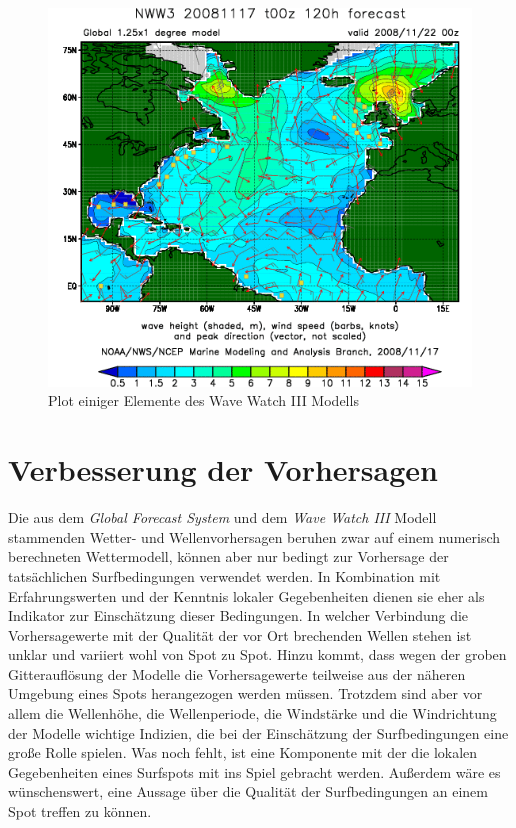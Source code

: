 \begin{figure}[h]
  \begin{center}
    \includegraphics[width=\textwidth]{bilder/wave-watch}
    \caption{Plot einiger Elemente des Wave Watch III Modells}
    \label{wave-watch-grads}
  \end{center}
\end{figure}

\section{Verbesserung der Vorhersagen}
Die aus dem \textit{Global Forecast System} und dem \textit{Wave Watch
  III} Modell stammenden Wetter- und Wellenvorhersagen beruhen zwar
auf einem numerisch berechneten Wettermodell, können aber nur bedingt
zur Vorhersage der tatsächlichen Surfbedingungen verwendet werden. In
Kombination mit Erfahrungswerten und der Kenntnis lokaler
Gegebenheiten dienen sie eher als Indikator zur Einschätzung dieser
Bedingungen. In welcher Verbindung die Vorhersagewerte mit der
Qualität der vor Ort brechenden Wellen stehen ist unklar und variiert
wohl von Spot zu Spot. Hinzu kommt, dass wegen der groben
Gitterauflösung der Modelle die Vorhersagewerte teilweise aus der
näheren Umgebung eines Spots herangezogen werden müssen. Trotzdem sind
aber vor allem die Wellenhöhe, die Wellenperiode, die Windstärke und
die Windrichtung der Modelle wichtige Indizien, die bei der
Einschätzung der Surfbedingungen eine große Rolle spielen. Was noch
fehlt, ist eine Komponente mit der die lokalen Gegebenheiten eines
Surfspots mit ins Spiel gebracht werden. Außerdem wäre es
wünschenswert, eine Aussage über die Qualität der Surfbedingungen an
einem Spot treffen zu können.

